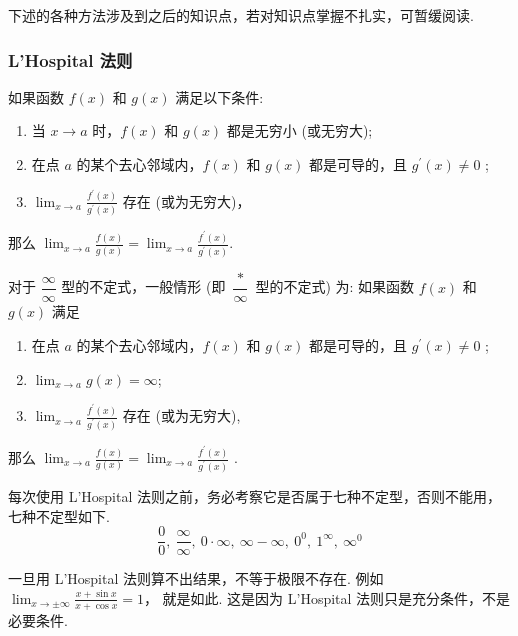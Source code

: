 下述的各种方法涉及到之后的知识点，若对知识点掌握不扎实，可暂缓阅读.

\subsubsection{L'Hospital 法则}

\begin{theorem}
    如果函数 $f(x)$ 和 $g(x)$ 满足以下条件:\label{LHospitalLaw}
    \begin{enumerate}[label=(\arabic{*})]
        \item 当 $ x \rightarrow a $ 时，$f(x) $ 和 $ g(x) $ 都是无穷小 (或无穷大);
        \item 在点 $ a $ 的某个去心邻域内，$f(x) $ 和 $ g(x) $ 都是可导的，且 $ g^{\prime}(x) \neq 0$ ;
        \item $\displaystyle\lim _{x \rightarrow a} \frac{f^{\prime}(x)}{g^{\prime}(x)} $ 存在 (或为无穷大)，
    \end{enumerate}
    那么 $ \displaystyle\lim _{x \rightarrow a} \frac{f(x)}{g(x)}=\lim _{x \rightarrow a} \frac{f^{\prime}(x)}{g^{\prime}(x)} .$
\end{theorem}

\begin{theorem}
    对于 $ \dfrac{\infty}{\infty} $ 型的不定式，一般情形 (即 $ \dfrac{*}{\infty} $ 型的不定式) 为: 如果函数 $ f(x) $ 和 $ g(x) $ 满足
    \begin{enumerate}[label=(\arabic{*})]
        \item 在点 $ a $ 的某个去心邻域内，$f(x) $ 和 $ g(x) $ 都是可导的，且 $ g^{\prime}(x) \neq 0$ ;
        \item $\displaystyle\lim _{x \rightarrow a} g(x)=\infty $;
        \item $\displaystyle\lim _{x \rightarrow a} \frac{f^{\prime}(x)}{g^{\prime}(x)} $ 存在 (或为无穷大),
    \end{enumerate}
    那么 $\displaystyle \lim _{x \rightarrow a} \frac{f(x)}{g(x)}=\lim _{x \rightarrow a} \frac{f^{\prime}(x)}{g^{\prime}(x)}$ .
\end{theorem}

每次使用 L'Hospital 法则之前，务必考察它是否属于七种不定型，否则不能用，七种不定型如下.
$$\frac{0}{0},~\frac{\infty}{\infty},~0\cdot\infty,~\infty-\infty,~0^0,~1^\infty,~\infty^0$$

一旦用 L'Hospital 法则算不出结果，不等于极限不存在. 例如 $\displaystyle\lim_{x\to\pm\infty}\frac{x+\sin x}{x+\cos x}=1$，
就是如此. 这是因为 L'Hospital 法则只是充分条件，不是必要条件.

